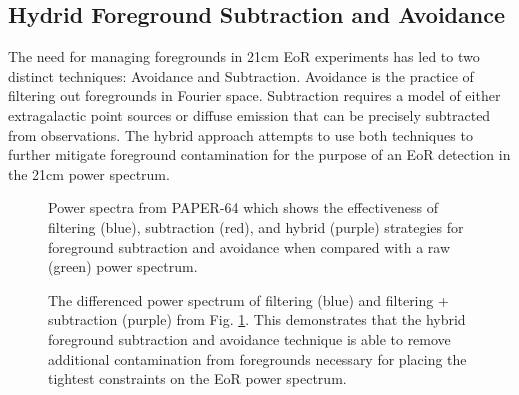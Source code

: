 \documentclass[a0,landscape]{a0poster}
\begin{document}
\begin{multicols}{4}
\subsection*{Hydrid Foreground Subtraction and Avoidance}
The need for managing foregrounds in 21cm EoR experiments has led to two distinct techniques: Avoidance and Subtraction. Avoidance is the practice of filtering out foregrounds in Fourier space. Subtraction requires a model of either extragalactic point sources or diffuse emission that can be precisely subtracted from observations. The hybrid approach attempts to use both techniques to further mitigate foreground contamination for the purpose of an EoR detection in the 21cm power spectrum.

\begin{figure}[H]
\centering
{}
\caption{Power spectra from PAPER-64 which shows the effectiveness of filtering (blue), subtraction (red), and hybrid (purple) strategies for foreground subtraction and avoidance when compared with a raw (green) power spectrum.}
\label{fig:stages}
\end{figure}

\begin{figure}[H]
\centering
{}
\caption{The differenced power spectrum of filtering (blue) and filtering + subtraction (purple) from Fig. \ref{fig:stages}. This demonstrates that the hybrid foreground subtraction and avoidance technique is able to remove additional contamination from foregrounds necessary for placing the tightest constraints on the EoR power spectrum.}
\label{fig:diffmid}
\end{figure}


\end{multicols}
\end{document}
